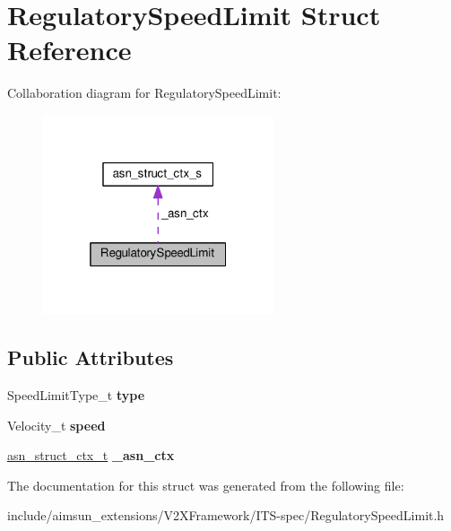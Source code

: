 \hypertarget{structRegulatorySpeedLimit}{}\section{Regulatory\+Speed\+Limit Struct Reference}
\label{structRegulatorySpeedLimit}


Collaboration diagram for Regulatory\+Speed\+Limit\+:\nopagebreak
\begin{figure}[H]
\begin{center}
\leavevmode
\includegraphics[width=193pt]{structRegulatorySpeedLimit__coll__graph}
\end{center}
\end{figure}
\subsection*{Public Attributes}
\begin{DoxyCompactItemize}
\item 
Speed\+Limit\+Type\+\_\+t {\bfseries type}\hypertarget{structRegulatorySpeedLimit_a779917379b7df4c3bf5dba2582e70307}{}\label{structRegulatorySpeedLimit_a779917379b7df4c3bf5dba2582e70307}

\item 
Velocity\+\_\+t {\bfseries speed}\hypertarget{structRegulatorySpeedLimit_a90afb248b422c482f6165bb0486c7b44}{}\label{structRegulatorySpeedLimit_a90afb248b422c482f6165bb0486c7b44}

\item 
\hyperlink{structasn__struct__ctx__s}{asn\+\_\+struct\+\_\+ctx\+\_\+t} {\bfseries \+\_\+asn\+\_\+ctx}\hypertarget{structRegulatorySpeedLimit_a5a1c010bce9e548d63877c3d2e4dc8ed}{}\label{structRegulatorySpeedLimit_a5a1c010bce9e548d63877c3d2e4dc8ed}

\end{DoxyCompactItemize}


The documentation for this struct was generated from the following file\+:\begin{DoxyCompactItemize}
\item 
include/aimsun\+\_\+extensions/\+V2\+X\+Framework/\+I\+T\+S-\/spec/Regulatory\+Speed\+Limit.\+h\end{DoxyCompactItemize}
